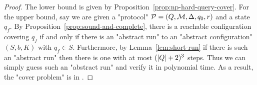 

\thmNPComplete*

\begin{proof}
	The lower bound is given by Proposition~\ref{prop:np-hard-query-cover}.
	For the upper bound, say we are given a "protocol" $\mathcal{P} = (Q, \mathcal{M}, \Delta, q_0, r)$ and a state $q_f$. By Proposition~\ref{prop:sound-and-complete}, there is a reachable configuration covering $q_f$ if and only if there is an "abstract run" to an "abstract configuration" $(S,b, K)$ with $q_f \in S$.
	Furthermore, by Lemma~\ref{lem:short-run} if there is such an "abstract run" then there is one with at most $(|Q|+2)^3$ steps. 
	Thus we can simply guess such an "abstract run" and verify it in polynomial time.
	As a result, the "cover problem" is in \NP. 
\end{proof}